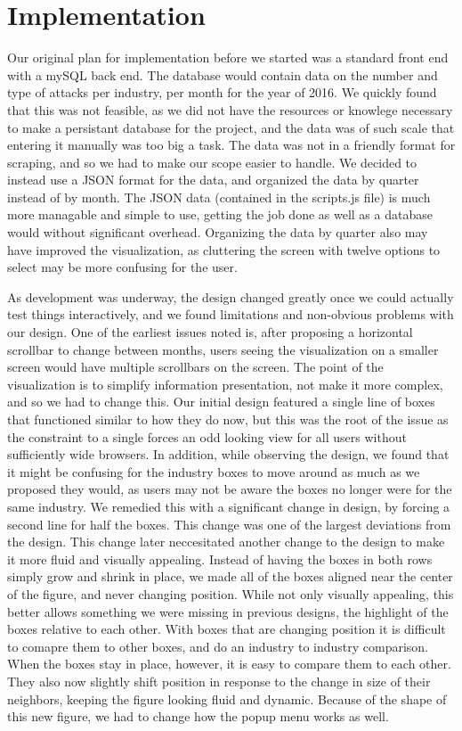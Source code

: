 \documentclass[journal]{vgtc}                %
\begin{document}
\section{Implementation}
Our original plan for implementation before we started was a standard front end with a mySQL back end. The database 
would contain data on the number and type of attacks per industry, per month for the year of 2016. We quickly found
that this was not feasible, as we did not have the resources or knowlege necessary to make a persistant database for
the project, and the data was of such scale that entering it manually was too big a task. The data was not in a friendly
format for scraping, and so we had to make our scope easier to handle. We decided to instead use a JSON format for the 
data, and organized the data by quarter instead of by month. The JSON data (contained in the scripts.js file) is much
more managable and simple to use, getting the job done as well as a database would without significant overhead.
Organizing the data by quarter also may have improved the visualization, as cluttering the screen with twelve options
to select may be more confusing for the user.

As development was underway, the design changed greatly once we could actually test things interactively, and we found 
limitations and non-obvious problems with our design. One of the earliest issues noted is, after proposing a horizontal
scrollbar to change between months, users seeing the visualization on a smaller screen would have multiple scrollbars 
on the screen. The point of the visualization is to simplify information presentation, not make it more complex, and so 
we had to change this. Our initial design featured a single line of boxes that functioned similar to how they do now,
but this was the root of the issue as the constraint to a single forces an odd looking view for all users without 
sufficiently wide browsers. In addition, while observing the design, we found that it might be confusing for the industry
boxes to move around as much as we proposed they would, as users may not be aware the boxes no longer were for the same 
industry. We remedied this with a significant change in design, by forcing a second line for half the boxes. This change 
was one of the largest deviations from the design. This change later neccesitated another change to the design to make
it more fluid and visually appealing. Instead of having the boxes in both rows simply grow and shrink in place, we made
all of the boxes aligned near the center of the figure, and never changing position. While not only visually appealing, this better allows something 
we were missing in previous designs, the highlight of the boxes relative to each other. With boxes that are changing position
it is difficult to comapre them to other boxes, and do an industry to industry comparison. When the boxes stay in place, 
however, it is easy to compare them to each other. They also now slightly shift position in response to the change in size
of their neighbors, keeping the figure looking fluid and dynamic. Because of the shape of this new figure, we had to change 
how the popup menu works as well.
\end{document}
